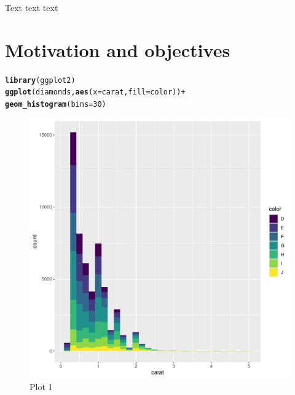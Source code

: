 \documentclass[12pt]{report}\usepackage[]{graphicx}\usepackage[]{xcolor}
\makeatletter
\newcommand{\hlnum}[1]{\textcolor[rgb]{0.686,0.059,0.569}{#1}}%
\newcommand{\hlopt}[1]{\textcolor[rgb]{0,0,0}{#1}}%
\newcommand{\hlstd}[1]{\textcolor[rgb]{0.345,0.345,0.345}{#1}}%
\newcommand{\hlkwc}[1]{\textcolor[rgb]{0.333,0.667,0.333}{#1}}%
\newcommand{\hlkwd}[1]{\textcolor[rgb]{0.737,0.353,0.396}{\textbf{#1}}}%
\newenvironment{kframe}{%
 \def\at@end@of@kframe{}%
 \ifinner\ifhmode%
  \def\at@end@of@kframe{\end{minipage}}%
  \begin{minipage}{\columnwidth}%
 \fi\fi%
 \def\FrameCommand##1{\hskip\@totalleftmargin \hskip-\fboxsep
 \colorbox{shadecolor}{##1}\hskip-\fboxsep
     \hskip-\linewidth \hskip-\@totalleftmargin \hskip\columnwidth}%
 \MakeFramed {\advance\hsize-\width
   \@totalleftmargin\z@ \linewidth\hsize
   \@setminipage}}%
 {\par\unskip\endMakeFramed%
 \at@end@of@kframe}
\newenvironment{knitrout}{}{} %
\makeatother
\begin{document}
    Text text text

    \pagebreak

    \chapter*{Motivation and objectives}\label{ch:sec1}

\begin{knitrout}
\color{fgcolor}\begin{kframe}
\begin{alltt}
\hlkwd{library}\hlstd{(ggplot2)}
\hlkwd{ggplot}\hlstd{(diamonds,} \hlkwd{aes}\hlstd{(}\hlkwc{x} \hlstd{= carat,} \hlkwc{fill} \hlstd{= color))} \hlopt{+}
\hlkwd{geom_histogram}\hlstd{(}\hlkwc{bins} \hlstd{=} \hlnum{30}\hlstd{)}
\end{alltt}
\end{kframe}\begin{figure}[H]

{\centering \includegraphics[width=0.75\linewidth]{figure/unnamed-chunk-1-1} 

}

\caption{\label{fig:fig1}Plot 1}\label{fig:unnamed-chunk-1}
\end{figure}

\end{knitrout}
    \pagebreak
    
\end{document}
